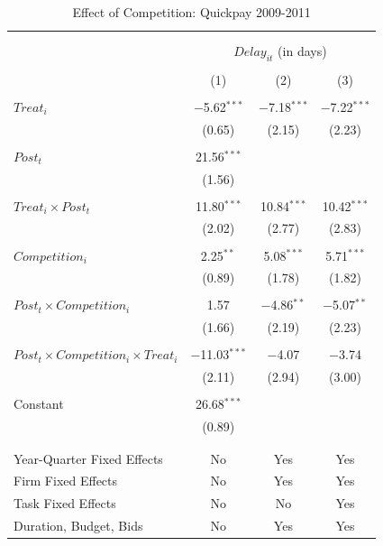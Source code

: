 \documentclass[
]{article}
\begin{document}
\begin{table}[H] \centering 
  \caption{Effect of Competition: Quickpay 2009-2011} 
  \label{} 
\small 
\begin{tabular}{@{\extracolsep{-2pt}}lccc} 
\\[-1.8ex]\hline 
\hline \\[-1.8ex] 
\\[-1.8ex] & \multicolumn{3}{c}{$Delay_{it}$ (in days)} \\ 
\\[-1.8ex] & (1) & (2) & (3)\\ 
\hline \\[-1.8ex] 
 $Treat_i$ & $-$5.62$^{***}$ & $-$7.18$^{***}$ & $-$7.22$^{***}$ \\ 
  & (0.65) & (2.15) & (2.23) \\ 
  & & & \\ 
 $Post_t$ & 21.56$^{***}$ &  &  \\ 
  & (1.56) &  &  \\ 
  & & & \\ 
 $Treat_i \times Post_t$ & 11.80$^{***}$ & 10.84$^{***}$ & 10.42$^{***}$ \\ 
  & (2.02) & (2.77) & (2.83) \\ 
  & & & \\ 
 $Competition_i$ & 2.25$^{**}$ & 5.08$^{***}$ & 5.71$^{***}$ \\ 
  & (0.89) & (1.78) & (1.82) \\ 
  & & & \\ 
 $Post_t \times Competition_i$ & 1.57 & $-$4.86$^{**}$ & $-$5.07$^{**}$ \\ 
  & (1.66) & (2.19) & (2.23) \\ 
  & & & \\ 
 $Post_t \times Competition_i \times Treat_i$ & $-$11.03$^{***}$ & $-$4.07 & $-$3.74 \\ 
  & (2.11) & (2.94) & (3.00) \\ 
  & & & \\ 
 Constant & 26.68$^{***}$ &  &  \\ 
  & (0.89) &  &  \\ 
  & & & \\ 
\hline \\[-1.8ex] 
Year-Quarter Fixed Effects & No & Yes & Yes \\ 
Firm Fixed Effects & No & Yes & Yes \\ 
Task Fixed Effects & No & No & Yes \\ 
Duration, Budget, Bids & No & Yes & Yes \\ 

\end{tabular}
\end{table}
\end{document}
